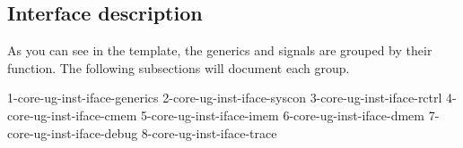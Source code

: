 
\subsection{Interface description}
\label{sec:core-ug-inst-iface}

As you can see in the template, the generics and signals are grouped by their 
function. The following subsections will document each group.

{1-core-ug-inst-iface-generics}
{2-core-ug-inst-iface-syscon}
{3-core-ug-inst-iface-rctrl}
{4-core-ug-inst-iface-cmem}
{5-core-ug-inst-iface-imem}
{6-core-ug-inst-iface-dmem}
{7-core-ug-inst-iface-debug}
{8-core-ug-inst-iface-trace}


